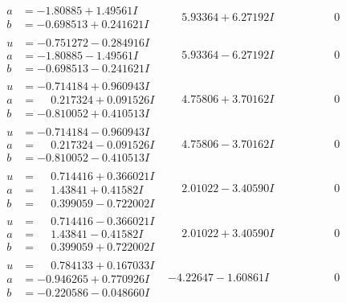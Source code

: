 \documentclass[1p]{elsarticle_modified}
\theoremstyle{definition}
\begin{document}
$$\begin{array}{c|c|c}
\begin{aligned}
a &= -1.80885 + 1.49561 I \\
b &= -0.698513 + 0.241621 I\end{aligned}
 & \phantom{-}5.93364 + 6.27192 I & \phantom{-0.000000 } 0 \\ \hline\begin{aligned}
u &= -0.751272 - 0.284916 I \\
a &= -1.80885 - 1.49561 I \\
b &= -0.698513 - 0.241621 I\end{aligned}
 & \phantom{-}5.93364 - 6.27192 I & \phantom{-0.000000 } 0 \\ \hline\begin{aligned}
u &= -0.714184 + 0.960943 I \\
a &= \phantom{-}0.217324 + 0.091526 I \\
b &= -0.810052 + 0.410513 I\end{aligned}
 & \phantom{-}4.75806 + 3.70162 I & \phantom{-0.000000 } 0 \\ \hline\begin{aligned}
u &= -0.714184 - 0.960943 I \\
a &= \phantom{-}0.217324 - 0.091526 I \\
b &= -0.810052 - 0.410513 I\end{aligned}
 & \phantom{-}4.75806 - 3.70162 I & \phantom{-0.000000 } 0 \\ \hline\begin{aligned}
u &= \phantom{-}0.714416 + 0.366021 I \\
a &= \phantom{-}1.43841 + 0.41582 I \\
b &= \phantom{-}0.399059 - 0.722002 I\end{aligned}
 & \phantom{-}2.01022 - 3.40590 I & \phantom{-0.000000 } 0 \\ \hline\begin{aligned}
u &= \phantom{-}0.714416 - 0.366021 I \\
a &= \phantom{-}1.43841 - 0.41582 I \\
b &= \phantom{-}0.399059 + 0.722002 I\end{aligned}
 & \phantom{-}2.01022 + 3.40590 I & \phantom{-0.000000 } 0 \\ \hline\begin{aligned}
u &= \phantom{-}0.784133 + 0.167033 I \\
a &= -0.946265 + 0.770926 I \\
b &= -0.220586 - 0.048660 I\end{aligned}
 & -4.22647 - 1.60861 I & \phantom{-0.000000 } 0 \\ \hline\begin{aligned}

\end{aligned}
\end{array}$$
\end{document}
